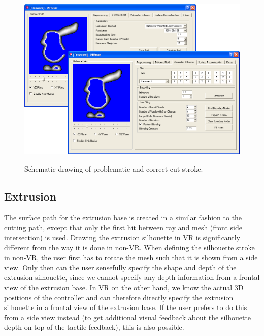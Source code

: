 \begin{figure}[!h]
    \centering
    \includegraphics[width=0.7260\linewidth]{figures/voldiff_ui}\\
    \caption[Schematic drawing of problematic cut stroke.]{Schematic drawing of problematic and correct cut stroke.
      \label{fig:schematiccut}}
\end{figure}

\subsection{Extrusion}

The surface path for the extrusion base is created in a similar fashion to the cutting path, except that only the first hit between ray and mesh (front side intersection) is used.
Drawing the extrusion silhouette in VR is significantly different from the way it is done in non-VR. When defining the silhouette stroke in non-VR, the user first has to rotate the mesh such that it is shown from a side view. Only then can the user sensefully specify the shape and depth of the extrusion silhouette, since we cannot specify any depth information from a frontal view of the extrusion base. 
In VR on the other hand, we know the actual 3D positions of the controller and can therefore directly specify the extrusion silhouette in a frontal view of the extrusion base. If the user prefers to do this from a side view instead (to get additional visual feedback about the silhouette depth on top of the tactile feedback), this is also possible.

